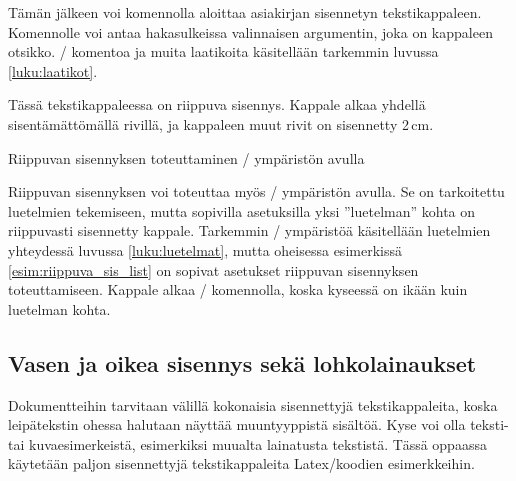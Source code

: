 \begin{koodilohkosis}
  \newlength{\sarkain}
  \setlength{\sarkain}{2.3cm}
  \newcommand{\kappale}[1][]{\par\hangpara{2\sarkain}{1}%
    \makebox[2\sarkain][l]{\ignorespaces #1}\ignorespaces}
\end{koodilohkosis}

Tämän jälkeen voi komennolla  aloittaa asiakirjan
sisennetyn tekstikappaleen. Komennolle voi antaa hakasulkeissa
valinnaisen argumentin, joka on kappaleen otsikko. \-/
komentoa ja muita laatikoita käsitellään tarkemmin luvussa
\ref{luku:laatikot}.

\begin{esimerkki*}
  \komentoi{,}

\begin{koodilohko}
  \begin{list}{}{
      \setlength{\leftmargin}{2cm}
      \setlength{\itemindent}{-2cm}
    }
  \item Tässä tekstikappaleessa on riippuva sisennys. Kappale alkaa
    yhdellä sisentämättömällä rivillä, ja kappaleen muut rivit on
    sisennetty 2\,cm.
  \end{list}
\end{koodilohko}
\caption{Riippuvan sisennyksen toteuttaminen \-/
  ympäristön avulla}
\label{esim:riippuva_sis_list}
\end{esimerkki*}

Riippuvan sisennyksen voi toteuttaa myös \-/ ympäristön
avulla. Se on tarkoitettu luetelmien tekemiseen, mutta sopivilla
asetuksilla yksi ''luetelman'' kohta on riippuvasti sisennetty kappale.
Tarkemmin \-/ ympäristöä käsitellään luetelmien
yhteydessä luvussa \ref{luku:luetelmat}, mutta oheisessa esimerkissä
\ref{esim:riippuva_sis_list} on sopivat asetukset riippuvan sisennyksen
toteuttamiseen. Kappale alkaa \-/ komennolla, koska
kyseessä on ikään kuin luetelman kohta.

\subsection{Vasen ja oikea sisennys sekä lohkolainaukset}

Dokumentteihin tarvitaan välillä kokonaisia sisennettyjä
tekstikappaleita, koska leipätekstin ohessa halutaan näyttää
muuntyyppistä sisältöä. Kyse voi olla teksti- tai kuvaesimerkeistä,
esimerkiksi muualta lainatusta tekstistä. Tässä oppaassa käytetään
paljon sisennettyjä tekstikappaleita Latex\-/koodien esimerkkeihin.


